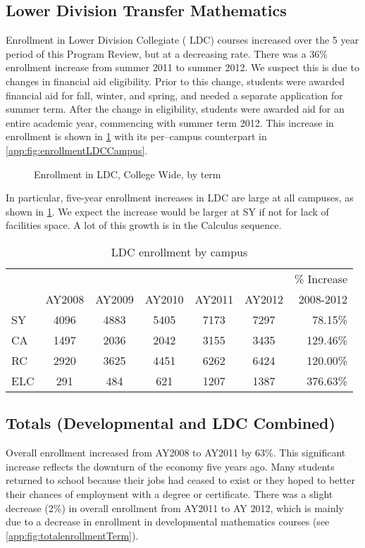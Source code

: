 \subsection{Lower Division Transfer Mathematics}
Enrollment in Lower Division Collegiate ( LDC) courses increased over the 5 year period of this Program Review, but at a decreasing rate. There was a 36\% enrollment increase from summer 2011 to summer 2012. We suspect this is due to changes in financial aid eligibility. Prior to this change, students were awarded financial aid for fall, winter, and spring, and needed a separate application for summer term.  After the change in eligibility, students were awarded aid for an entire academic year, commencing with summer term 2012.  This increase in enrollment is shown in \cref{needs:fig:enrollmentLDCTerm} with its per--campus counterpart in \vref{app:fig:enrollmentLDCCampus}.

\begin{figure}[!htb]
	\centering
	
	\caption{Enrollment in LDC, College Wide, by term}
	\label{needs:fig:enrollmentLDCTerm}
\end{figure}

In particular, five-year enrollment increases  in LDC are large at all campuses, as shown in \cref{needs:tab:LDCenrollmentCampus}.  We expect the increase would be larger at SY if not for lack of facilities space. A lot of this growth is in the Calculus sequence.   

\begin{table}[!htb]
	\centering
	\caption{LDC enrollment by campus}
	\label{needs:tab:LDCenrollmentCampus}
	\begin{tabular}{l*{5}{c}r}
		\toprule
		    &        &        &        &        &        & \% Increase \\
		    & AY2008 & AY2009 & AY2010 & AY2011 & AY2012 & 2008-2012   \\
		\midrule
		SY  & 4096   & 4883   & 5405   & 7173   & 7297   & 78.15\%     \\
		CA  & 1497   & 2036   & 2042   & 3155   & 3435   & 129.46\%    \\
		RC  & 2920   & 3625   & 4451   & 6262   & 6424   & 120.00\%    \\
		ELC & 291    & 484    & 621    & 1207   & 1387   & 376.63\%    \\
		\bottomrule
	\end{tabular}
\end{table}

\subsection{Totals (Developmental and LDC Combined)}
Overall enrollment increased from AY2008 to AY2011 by 63\%. This significant increase reflects the downturn of the economy five years ago. Many students returned to school because their jobs had ceased to exist or they hoped to better their chances of employment with a degree or certificate. There was a slight decrease (2\%) in overall enrollment from AY2011 to AY 2012, which is mainly due to a decrease in enrollment in developmental mathematics courses (see \vref{app:fig:totalenrollmentTerm}).

